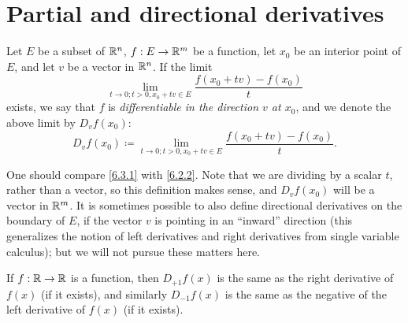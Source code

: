 \section{Partial and directional derivatives}\label{sec:6.3}

\begin{defn}\label{6.3.1}
  Let \(E\) be a subset of \(\mathbb{R}^n\), \(f : E \to \mathbb{R}^m\) be a function, let \(x_0\) be an interior point of \(E\), and let \(v\) be a vector in \(\mathbb{R}^n\).
  If the limit
  \[
    \lim_{t \to 0 ; t > 0, x_0 + tv \in E} \dfrac{f(x_0 + tv) - f(x_0)}{t}
  \]
  exists, we say that \(f\) is \emph{differentiable in the direction \(v\) at \(x_0\)}, and we denote the above limit by \(D_v f(x_0)\):
  \[
    D_v f(x_0) \coloneqq \lim_{t \to 0 ; t > 0, x_0 + tv \in E} \dfrac{f(x_0 + tv) - f(x_0)}{t}.
  \]
\end{defn}

\begin{rmk}\label{6.3.2}
  One should compare \cref{6.3.1} with \cref{6.2.2}.
  Note that we are dividing by a scalar \(t\), rather than a vector, so this definition makes sense, and \(D_v f(x_0)\) will be a vector in \(\mathbb{R}^m\).
  It is sometimes possible to also define directional derivatives on the boundary of \(E\), if the vector \(v\) is pointing in an ``inward'' direction
  (this generalizes the notion of left derivatives and right derivatives from single variable calculus);
  but we will not pursue these matters here.
\end{rmk}

\begin{eg}\label{6.3.3}
  If \(f : \mathbb{R} \to \mathbb{R}\) is a function, then \(D_{+1} f(x)\) is the same as the right derivative of \(f(x)\) (if it exists), and similarly \(D_{-1} f(x)\) is the same as the negative of the left derivative of \(f(x)\) (if it exists).
\end{eg}

